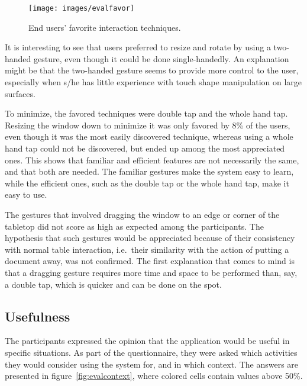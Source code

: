 \begin{figure}[htb]
  \centering
    \texttt{[image: images/evalfavor]}
    \caption{End users' favorite interaction techniques.}
    \label{fig:evalfavor}
\end{figure}

It is interesting to see that users preferred to resize and rotate by using a two-handed gesture, even though it could be done single-handedly.
An explanation might be that the two-handed gesture seems to provide more control to the user, especially when s/he has little experience with touch shape manipulation on large surfaces.

To minimize, the favored techniques were double tap and the whole hand tap.
Resizing the window down to minimize it was only favored by 8\% of the users, even though it was the most easily discovered technique, whereas using a whole hand tap could not be discovered, but ended up among the most appreciated ones.
This shows that familiar and efficient features are not necessarily the same, and that both are needed.
The familiar gestures make the system easy to learn, while the efficient ones, such as the double tap or the whole hand tap, make it easy to use.

The gestures that involved dragging the window to an edge or corner of the tabletop did not score as high as expected among the participants.
The hypothesis that such gestures would be appreciated because of their consistency with normal table interaction, i.e.\ their similarity with the action of putting a document away, was not confirmed.
The first explanation that comes to mind is that a dragging gesture requires more time and space to be performed than, say, a double tap, which is quicker and can be done on the spot.


\subsection{Usefulness}

The participants expressed the opinion that the application would be useful in specific situations.
As part of the questionnaire, they were asked which activities they would consider using the system for, and in which context.
The answers are presented in figure~\ref{fig:evalcontext}, where colored cells contain values above 50\%.

